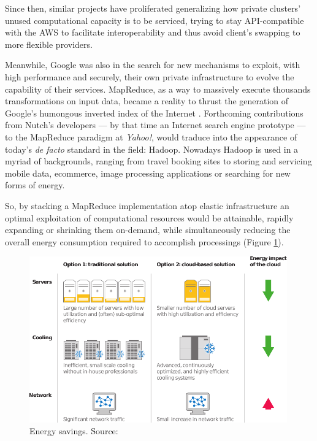 Since then, similar projects have proliferated generalizing how private clusters' unused computational capacity is to be serviced, trying to stay API-compatible with the AWS to facilitate interoperability and thus avoid client's swapping to more flexible providers.

Meanwhile, Google was also in the search for new mechanisms to exploit, with high performance and securely, their own private infrastructure to evolve the capability of their services. MapReduce, as a way to massively execute thousands transformations on input data, became a reality to thrust the generation of Google's humongous inverted index of the Internet \cite{googlemapreduce}. Forthcoming contributions from Nutch's developers --- by that time an Internet search engine prototype --- to the MapReduce paradigm at \emph{Yahoo!}, would traduce into the appearance of today's \emph{de facto} standard in the field: Hadoop. Nowadays Hadoop is used in a myriad of backgrounds, ranging from travel booking sites to storing and servicing mobile data, ecommerce, image processing applications or searching for new forms of energy.

So, by stacking a MapReduce implementation atop elastic infrastructure an optimal exploitation of computational resources would be attainable, rapidly expanding or shrinking them on-demand, while simultaneously reducing the overall energy consumption required to accomplish processings (Figure \ref{fig:energysavings}).


\begin{figure}[tbp]
\begin{center}
\includegraphics[width=0.99\textwidth]{imagenes/002.pdf}
 \caption{Energy savings. Source: \cite{googleapps}}
\label{fig:energysavings}
\end{center}
\end{figure}




